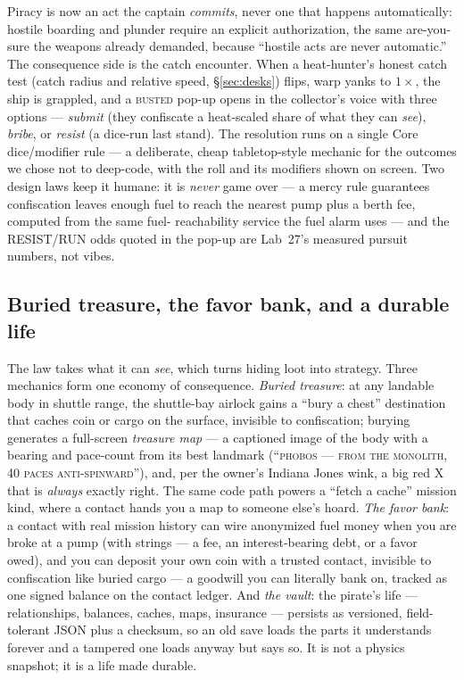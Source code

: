 \documentclass[10pt,twocolumn]{article}
\begin{document}
Piracy is now an act the captain \emph{commits}, never one that happens automatically:
hostile boarding and plunder require an explicit authorization, the same are-you-sure the
weapons already demanded, because ``hostile acts are never automatic.'' The consequence
side is the catch encounter. When a heat-hunter's honest catch test (catch radius and
relative speed, \S\ref{sec:desks}) flips, warp yanks to $1\times$, the ship is grappled,
and a \textsc{busted} pop-up opens in the collector's voice with three options ---
\emph{submit} (they confiscate a heat-scaled share of what they can \emph{see}),
\emph{bribe}, or \emph{resist} (a dice-run last stand). The resolution runs on a single
Core dice/modifier rule --- a deliberate, cheap tabletop-style mechanic for the outcomes we
chose not to deep-code, with the roll and its modifiers shown on screen. Two design laws
keep it humane: it is \emph{never} game over --- a mercy rule guarantees confiscation leaves
enough fuel to reach the nearest pump plus a berth fee, computed from the same fuel-%
reachability service the fuel alarm uses --- and the RESIST/RUN odds quoted in the pop-up
are Lab~27's measured pursuit numbers, not vibes.

\subsection{Buried treasure, the favor bank, and a durable life}

The law takes what it can \emph{see}, which turns hiding loot into strategy. Three
mechanics form one economy of consequence. \emph{Buried treasure}: at any landable body in
shuttle range, the shuttle-bay airlock gains a ``bury a chest'' destination that caches coin
or cargo on the surface, invisible to confiscation; burying generates a full-screen
\emph{treasure map} --- a captioned image of the body with a bearing and pace-count from its
best landmark (``\textsc{phobos --- from the monolith, 40 paces anti-spinward}''), and,
per the owner's Indiana Jones wink, a big red X that is \emph{always} exactly right. The
same code path powers a ``fetch a cache'' mission kind, where a contact hands you a map to
someone else's hoard. \emph{The favor bank}: a contact with real mission history can wire
anonymized fuel money when you are broke at a pump (with strings --- a fee, an
interest-bearing debt, or a favor owed), and you can deposit your own coin with a trusted
contact, invisible to confiscation like buried cargo --- a goodwill you can literally bank
on, tracked as one signed balance on the contact ledger. And \emph{the vault}: the pirate's
life --- relationships, balances, caches, maps, insurance --- persists as versioned, field-%
tolerant JSON plus a checksum, so an old save loads the parts it understands forever and a
tampered one loads anyway but says so. It is not a physics snapshot; it is a life made
durable.
\end{document}
